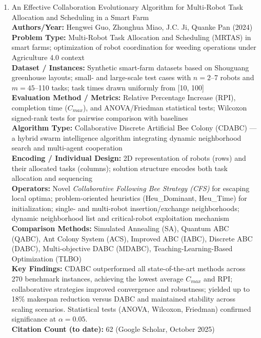 \documentclass[a4paper,12pt]{article}
\begin{document}
\begin{enumerate}[leftmargin=2em, labelwidth=1em, labelsep=0.5em, itemsep=1ex]
  \item An Effective Collaboration Evolutionary Algorithm for Multi-Robot Task Allocation and Scheduling in a Smart Farm \\
    \textbf{Authors/Year:} Hengwei Guo, Zhonghua Miao, J.C. Ji, Quanke Pan (2024) \\  
    \textbf{Problem Type:} Multi-Robot Task Allocation and Scheduling (MRTAS) in smart farms; optimization of robot coordination for weeding operations under Agriculture 4.0 context \\  
    \textbf{Dataset / Instances:} Synthetic smart-farm datasets based on Shouguang greenhouse layouts; small- and large-scale test cases with $n = 2$–7 robots and $m = 45$–110 tasks; task times drawn uniformly from [10, 100] \\  
    \textbf{Evaluation Method / Metrics:} Relative Percentage Increase (RPI), completion time ($C_{max}$), and ANOVA/Friedman statistical tests; Wilcoxon signed-rank tests for pairwise comparison with baselines \\  
    \textbf{Algorithm Type:} Collaborative Discrete Artificial Bee Colony (CDABC) — a hybrid swarm intelligence algorithm integrating dynamic neighborhood search and multi-agent cooperation \\  
    \textbf{Encoding / Individual Design:} 2D representation of robots (rows) and their allocated tasks (columns); solution structure encodes both task allocation and sequencing \\  
    \textbf{Operators:} Novel \textit{Collaborative Following Bee Strategy (CFS)} for escaping local optima; problem-oriented heuristics (Heu\_Dominant, Heu\_Time) for initialization; single- and multi-robot insertion/exchange neighborhoods; dynamic neighborhood list and critical-robot exploitation mechanism \\  
    \textbf{Comparison Methods:} Simulated Annealing (SA), Quantum ABC (QABC), Ant Colony System (ACS), Improved ABC (IABC), Discrete ABC (DABC), Multi-objective DABC (MDABC), Teaching-Learning-Based Optimization (TLBO) \\  
    \textbf{Key Findings:} CDABC outperformed all state-of-the-art methods across 270 benchmark instances, achieving the lowest average $C_{max}$ and RPI; collaborative strategies improved convergence and robustness; yielded up to 18\% makespan reduction versus DABC and maintained stability across scaling scenarios. Statistical tests (ANOVA, Wilcoxon, Friedman) confirmed significance at $\alpha = 0.05$. \\  
    \textbf{Citation Count (to date):} 62 (Google Scholar, October 2025) \\[2ex]
  


\end{enumerate}
\end{document}
